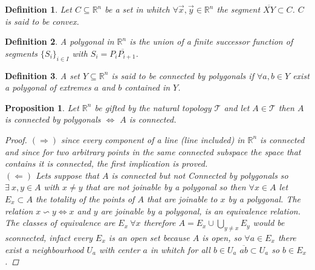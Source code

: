 \documentclass{article}
\newtheorem{proposition}{Proposition}
\newtheorem{definition}{Definition}
\begin{document}
        \newpage
            \begin{definition}
                Let $C \subseteq \mathbb{R}^n$ be a set in whitch $\forall \vec{x},\vec{y} \in \mathbb{R}^n$ the segment $\overline{XY} \subset C$. $C$ is said to be convex. 
            \end{definition}
            \begin{definition}
                A polygonal in $\mathbb{R}^n$ is the union of a finite successor function of segments $\{ S_i \}_{i \in I}$ with $S_i = \overline{P_iP_{i+1}}$.
                \begin{center}
                \end{center}
            \end{definition}
            \begin{definition}
                A set $Y \subseteq \mathbb{R}^n$ is said to be connected by polygonals if $\forall a,b \in Y$ exist a polygonal of extremes $a$ and $b$ contained in $Y$.
            \end{definition}
            \begin{proposition}
                Let $\mathbb{R}^n$ be gifted by the natural topology $\mathcal{T}$ and let $A \in \mathcal{T}$ then $A$ is connected by polygonals $\Longleftrightarrow$ $A$ is connected. 
                \begin{proof}
                    \textbf{$(\Longrightarrow)$} since every component of a line (line included) in $\mathbb{R}^n$ is connected and since for two arbitrary points in the same connected subspace the space that contains it is connected, the first implication is proved. \\
                    \textbf{$(\Longleftarrow)$} Lets suppose that $A$ is connected but not Connected by polygonals so $\exists \ x,y \in A$ with $x \neq y$ that are not joinable by a polygonal so then $\forall x \in A$ let $E_x \subset A$ the totality of the points of $A$ that are joinable to $x$ by a polygonal. The relation $x \backsim y \Longleftrightarrow x$ and $y$ are joinable by a polygonal, is an equivalence relation. \\ The classes of equivalence are $E_x \ \forall x$ therefore $A = E_x \cup \bigcup_{y \neq x}E_y$ would be sconnected, infact every $E_x$ is an open set because $A$ is open, so $\forall a \in E_x$ there exist a neighbourhood $U_a$ with center $a$ in whitch for all $b \in U_a$ $\overline{ab} \subset U_a$ so $b \in E_x$.  
                \end{proof}
            \end{proposition}
\end{document}
